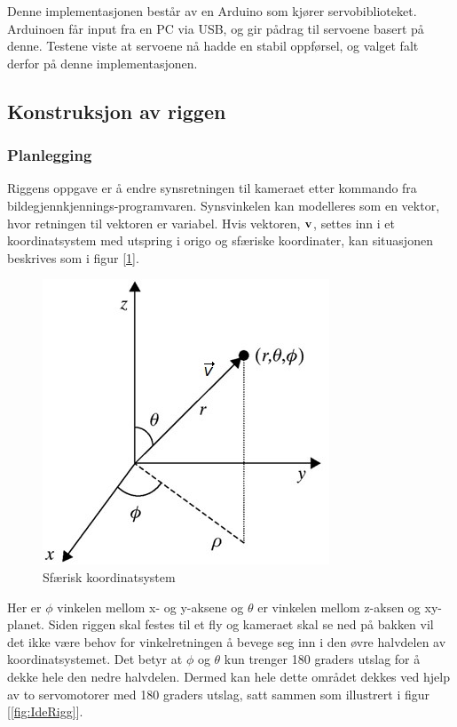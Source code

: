 Denne implementasjonen består av en Arduino som kjører servobiblioteket. Arduinoen får input fra en PC via USB, og gir pådrag til servoene basert på denne. Testene viste at servoene nå hadde en stabil oppførsel, og valget falt derfor på denne implementasjonen.

\subsection{Konstruksjon av riggen}

\subsubsection{Planlegging}
Riggens oppgave er å endre synsretningen til kameraet etter kommando fra bildegjennkjennings-programvaren. Synsvinkelen kan modelleres som en vektor, hvor retningen til vektoren er variabel. Hvis vektoren, $\bf{v}$, settes inn i et koordinatsystem med utspring i origo og sfæriske koordinater, kan situasjonen beskrives som i figur [\ref{fig:spher}].

\begin{figure}[h!]
	\centering
	\includegraphics[scale=0.5]{img/RettVek.jpg}
	\caption{Sfærisk koordinatsystem}
	\label{fig:spher}
\end{figure}

Her er $\phi$ vinkelen mellom x- og y-aksene og $\theta$ er vinkelen mellom z-aksen og xy-planet. Siden riggen skal festes til et fly og kameraet skal se ned på bakken vil det ikke være behov for vinkelretningen å bevege seg inn i den øvre halvdelen av koordinatsystemet. Det betyr at $\phi$ og $\theta$ kun trenger 180 graders utslag for å dekke hele den nedre halvdelen. Dermed kan hele dette området dekkes ved hjelp av to servomotorer med 180 graders utslag, satt sammen som illustrert i figur [\ref{fig:IdeRigg}].

